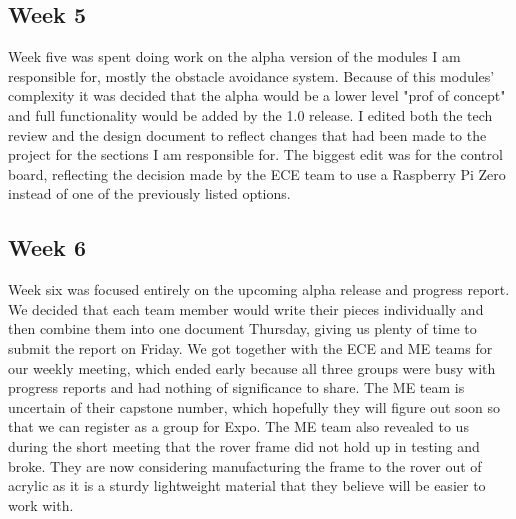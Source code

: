 \documentclass[10pt,letterpaper,onecolumn,draftclsnofoot,journal]{IEEEtran}
\begin{document}
\subsection{Week 5}
Week five was spent doing work on the alpha version of the modules I am responsible for, mostly the obstacle avoidance system. Because of this modules' complexity it was decided that the alpha would be a lower level "prof of concept" and full functionality would be added by the 1.0 release. I edited both the tech review and the design document to reflect changes that had been made to the project for the sections I am responsible for. The biggest edit was for the control board, reflecting the decision made by the ECE team to use a Raspberry Pi Zero instead of one of the previously listed options.

\subsection{Week 6}
Week six was focused entirely on the upcoming alpha release and progress report. We decided that each team member would write their pieces individually and then combine them into one document Thursday, giving us plenty of time to submit the report on Friday. We got together with the ECE and ME teams for our weekly meeting, which ended early because all three groups were busy with progress reports and had nothing of significance to share. The ME team is uncertain of their capstone number, which hopefully they will figure out soon so that we can register as a group for Expo. The ME team also revealed to us during the short meeting that the rover frame did not hold up in testing and broke. They are now considering manufacturing the frame to the rover out of acrylic as it is a sturdy lightweight material that they believe will be easier to work with.
\end{document}
